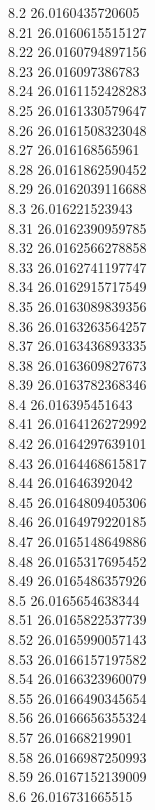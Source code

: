 {8.2	26.0160435720605\\
8.21	26.0160615515127\\
8.22	26.0160794897156\\
8.23	26.016097386783\\
8.24	26.0161152428283\\
8.25	26.0161330579647\\
8.26	26.0161508323048\\
8.27	26.016168565961\\
8.28	26.0161862590452\\
8.29	26.0162039116688\\
8.3	26.016221523943\\
8.31	26.0162390959785\\
8.32	26.0162566278858\\
8.33	26.0162741197747\\
8.34	26.0162915717549\\
8.35	26.0163089839356\\
8.36	26.0163263564257\\
8.37	26.0163436893335\\
8.38	26.0163609827673\\
8.39	26.0163782368346\\
8.4	26.016395451643\\
8.41	26.0164126272992\\
8.42	26.0164297639101\\
8.43	26.0164468615817\\
8.44	26.01646392042\\
8.45	26.0164809405306\\
8.46	26.0164979220185\\
8.47	26.0165148649886\\
8.48	26.0165317695452\\
8.49	26.0165486357926\\
8.5	26.0165654638344\\
8.51	26.0165822537739\\
8.52	26.0165990057143\\
8.53	26.0166157197582\\
8.54	26.0166323960079\\
8.55	26.0166490345654\\
8.56	26.0166656355324\\
8.57	26.01668219901\\
8.58	26.0166987250993\\
8.59	26.0167152139009\\
8.6	26.016731665515\\
}
